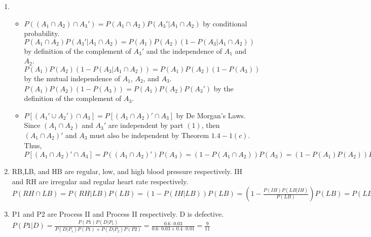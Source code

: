 \documentclass[10pt]{article}
\begin{document}
\begin{enumerate}[label=\textbf{Problem \arabic*.}]
\begin{itemize}
    \end{itemize}
    \item \begin{itemize}
        \item [(1)] $P((A_1\cap A_2)\cap A_3')=P(A_1\cap A_2)P(A_3'|A_1\cap A_2)$ by conditional probability. 
        $P(A_1\cap A_2)P(A_3'|A_1\cap A_2)=P(A_1)P(A_2)(1-P(A_3|A_1\cap A_2))$ by definition of the complement of $A_3'$ and the independence of $A_1$ and $A_2$.
        $P(A_1)P(A_2)(1-P(A_3|A_1\cap A_2))=P(A_1)P(A_2)(1-P(A_3))$ by the mutual independence of $A_1$, $A_2$, and $A_3$.
        $P(A_1)P(A_2)(1-P(A_3))=P(A_1)P(A_2)P(A_3')$ by the definition of the complement of $A_3$.
        \item [(2)] $P[(A_1'\cup A_2')\cap A_3]=P[(A_1\cap A_2)'\cap A_3]$ by De Morgan's Laws. 
        Since $(A_1\cap A_2)$ and $A_3'$ are independent by part $(1)$, then $(A_1\cap A_2)'$ and $A_3$ must also be independent by Theorem $1.4-1(c)$.
        Thus, $P[(A_1\cap A_2)'\cap A_3]=P((A_1\cap A_2)')P(A_3)=(1-P(A_1\cap A_2))P(A_3)=(1-P(A_1)P(A_2))P(A_3)=\frac{24}{125}$
    \end{itemize}
    \item RB,LB, and HB are regular, low, and high blood pressure respectively. IH and RH are irregular and regular heart rate respectively.\\
    $P(RH\cap LB)=P(RH|LB)P(LB)=(1-P(IH|LB))P(LB)=(1-\frac{P(IH)P(LB|IH)}{P(LB)})P(LB)=P(LB)-P(IH)P(LB|IH)=P(LB)-P(IH)(1-P(RB|IH)-P(HB|IH))=P(LB)-P(IH)(1-\frac{P(RB)P(IH|RB)}{P(IH)}-P(HB|IH))=P(LB)-P(IH)+P(RB)P(IH|RB)+P(IH)P(HB|IH)=P(LB)-P(IH)+(1-P(LB)-P(HB))P(IH|RB)+P(IH)P(HB|IH)=0.19-0.17+(1-0.19-0.16)\cdot0.11+0.17\cdot0.35=0.151$
    \item P1 and P2 are Process II and Process II respectively. D is defective.\\
    $P(P1|D)=\frac{P(P1)P(D|P_1)}{P(D|P_1)P(P1)+P(D|P_2)P(P2)}=\frac{0.6\cdot0.03}{0.6\cdot0.03+0.4\cdot0.01}=\frac{9}{11}$
\end{enumerate}
\end{document}
